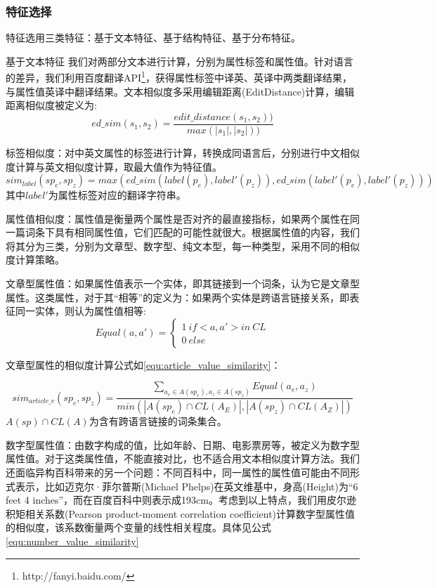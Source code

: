 \subsubsection{特征选择}
特征选用三类特征：基于文本特征、基于结构特征、基于分布特征。

{\heiti 基于文本特征} 我们对两部分文本进行计算，分别为属性标签和属性值。针对语言的差异，我们利用百度翻译API\footnote{http://fanyi.baidu.com/}，获得属性标签中译英、英译中两类翻译结果，与属性值英译中翻译结果。文本相似度多采用编辑距离(EditDistance)计算，编辑距离相似度被定义为:
\begin{equation}
ed\_sim(s_1, s_2) = \frac{edit\_distance(s_1, s_2))}{max(\left| s_1 \right |,\left | s_2 \right |))}
\end{equation}

标签相似度：对中英文属性的标签进行计算，转换成同语言后，分别进行中文相似度计算与英文相似度计算，取最大值作为特征值。
\begin{equation}
\label{}
sim_{label}(sp_e, sp_z) = max(ed\_sim(label(p_e), label'(p_z)), ed\_sim(label'(p_e), label'(p_z)))
\end{equation}
其中$label'$为属性标签对应的翻译字符串。

属性值相似度：属性值是衡量两个属性是否对齐的最直接指标，如果两个属性在同一篇词条下具有相同属性值，它们匹配的可能性就很大。根据属性值的内容，我们将其分为三类，分别为文章型、数字型、纯文本型，每一种类型，采用不同的相似度计算策略。

文章型属性值：如果属性值表示一个实体，即其链接到一个词条，认为它是文章型属性。这类属性，对于其“相等”的定义为：如果两个实体是跨语言链接关系，即表征同一实体，则认为属性值相等:
\begin{equation}
Equal(a,a')=\left\{\begin{matrix}
1 \ if <a,a'> in \ CL\\
0 \ else
\end{matrix}\right.
\end{equation}

文章型属性的相似度计算公式如\ref{equ:article_value_similarity}：

\begin{equation}
\label{equ:article_value_similarity}
sim_{article\_v}(sp_e, sp_z) = \frac{\sum_{a_e\in A(sp_e), a_z \in A(sp_z)} Equal(a_e, a_z)}{min(\left| A(sp_e)\cap CL(A_E) \right|, \left|A(sp_z) \cap CL(A_Z) \right|)}
\end{equation}
$A(sp)\cap CL(A)$为含有跨语言链接的词条集合。

数字型属性值：由数字构成的值，比如年龄、日期、电影票房等，被定义为数字型属性值。对于这类属性值，不能直接对比，也不适合用文本相似度计算方法。我们还面临异构百科带来的另一个问题：不同百科中，同一属性的属性值可能由不同形式表示，比如迈克尔·菲尔普斯(Michael Phelps)在英文维基中，身高(Height)为“6 feet 4 inches”，而在百度百科中则表示成193cm。考虑到以上特点，我们用皮尔逊积矩相关系数(Pearson product-moment correlation coefficient)计算数字型属性值的相似度，该系数衡量两个变量的线性相关程度。具体见公式\ref{equ:number_value_similarity}

